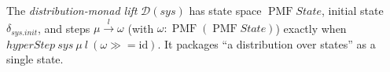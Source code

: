 \begin{definition}
  \label{def:dist}
  \leanok
  The \emph{distribution-monad lift} $\mathcal{D}(sys)$ has state space $\operatorname{PMF} State$, initial state $\delta_{sys.init}$, and steps $\mu \xrightarrow{l} \omega$ (with $\omega : \operatorname{PMF}(\operatorname{PMF} State)$) exactly when $hyperStep\ sys\ \mu\ l\ (\omega \mathbin{\gg\!=}\mathrm{id})$.
  It packages ``a distribution over states'' as a single state.
\end{definition}
